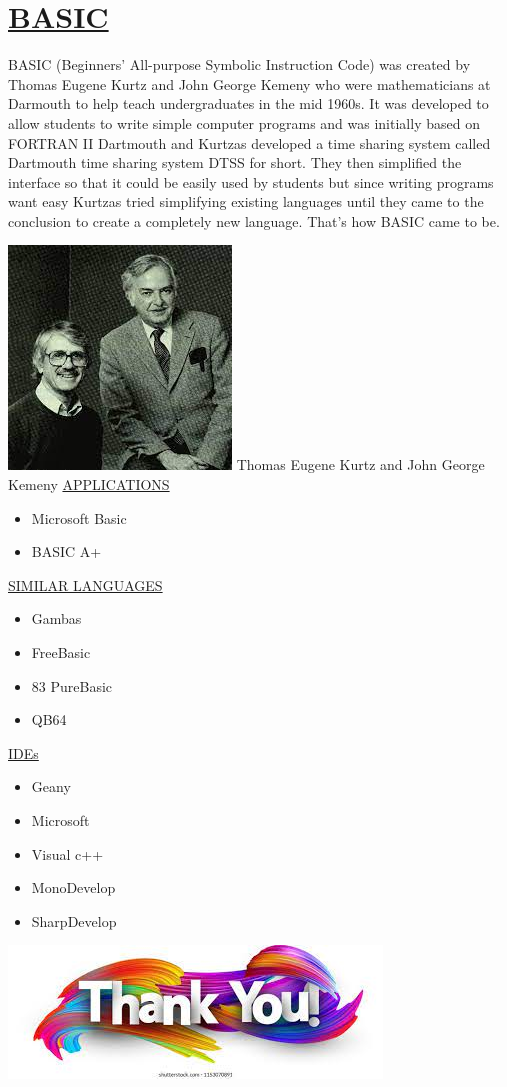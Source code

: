 \documentclass{article}
\begin{document}
\newpage
\section{\underline{BASIC}}
BASIC (Beginners' All-purpose Symbolic Instruction Code) was created by Thomas Eugene Kurtz  and John George Kemeny who were mathematicians at Darmouth to help teach undergraduates in the mid 1960s. It was developed to allow students to write simple computer programs and was initially based on FORTRAN II
Dartmouth and Kurtzas developed a time sharing system called Dartmouth time sharing system DTSS for short. They then simplified the interface so that it could be easily used by students but since writing programs want easy Kurtzas tried simplifying existing languages until they came to the conclusion to create a completely new language. That’s how BASIC came to be. 

\newpage
\includegraphics{basic guys.jpg}
{Thomas Eugene Kurtz  and John George Kemeny}
\newpage
\underline{APPLICATIONS}
\begin{itemize}
	\item Microsoft Basic
	\item BASIC A+
	\end{itemize}

\underline{SIMILAR LANGUAGES}
\begin{itemize}
\item Gambas
\item FreeBasic
\item 83 PureBasic
\item QB64
\end{itemize}

\underline{IDEs}
\begin{itemize}
\item Geany
\item Microsoft \item Visual c++
\item MonoDevelop
\item SharpDevelop
\end{itemize}

\newpage
\includegraphics{thanks.jpg}

	
\end{document}
